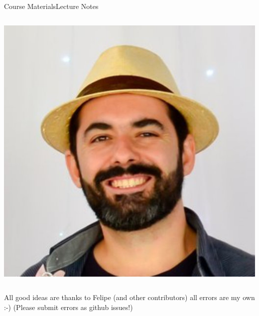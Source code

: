 \documentclass{beamer}
\begin{document}
\begin{CJK}{UTF8}{ipxm}
\begin{frame}{Course Materials}{Lecture Notes}
\begin{columns}
    \hfill\includegraphics[width=1\textwidth]{../img/Felipe_Campelo}
  \end{columns}
  \vspace{1cm}

  All good ideas are thanks to Felipe (and other contributors) all errors are my own :-) (Please submit errors as github issues!)
\end{frame}


\end{CJK}
\end{document}

